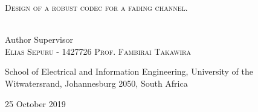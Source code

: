 \begin{titlepage}
\begin{center}
      	\textsc{
      		\LARGE
      	Design of a robust codec for a fading channel.}
      
      	\HRule \\[1.5cm] %
      	
      	
      	\hspace{0.60cm} Author \hspace{4.1cm} Supervisor\\
      	\hspace{0.45cm}\textsc{Elias Sepuru - 1427726} \hspace{1cm}\textsc{Prof. Fambirai Takawira}
      	
      	{
      		\vspace{1cm}
      		School of Electrical and Information Engineering,
      		University of the Witwatersrand, Johannesburg 2050, South Africa
      		\\
        }
    	
    	\vspace*{1cm}	
    	{25 October 2019}
    	
      	\vspace*{\fill}
    
 
   \end{center}
\end{titlepage}